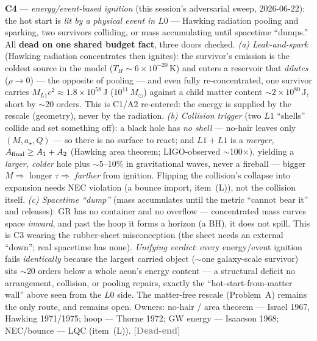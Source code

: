 \documentclass[11pt]{article}
\newcommand{\dead}{\textcolor{gray}{\textbf{[Dead-end]}}}
\newcommand{\msun}{M_\odot}
\begin{document}
\textbf{C4} --- \emph{energy/event-based ignition} (this session's adversarial sweep, 2026-06-22): the hot start is \emph{lit by a physical event in $L0$} --- Hawking radiation pooling and sparking, two survivors colliding, or mass accumulating until spacetime ``dumps.'' All \textbf{dead on one shared budget fact}, three doors checked. \emph{(a) Leak-and-spark} (Hawking radiation concentrates then ignites): the survivor's emission is the coldest source in the model ($T_H\sim6\times10^{-20}$\,K) and enters a reservoir that \emph{dilutes} ($\rho\to0$) --- the opposite of pooling --- and even fully re-concentrated, one survivor carries $M_{L1}c^2\approx1.8\times10^{58}$\,J ($10^{11}\,\msun$) against a child matter content $\sim2\times10^{80}$\,J, short by $\sim$20 orders. This is C1/A2 re-entered: the energy is supplied by the rescale (geometry), never by the radiation. \emph{(b) Collision trigger} (two $L1$ ``shells'' collide and set something off): a black hole has \emph{no shell} --- no-hair leaves only $(M,a_\star,Q)$ --- so there is no surface to react; and $L1+L1$ is a \emph{merger}, $A_{\rm final}\ge A_1+A_2$ (Hawking area theorem; LIGO-observed $\sim$100$\times$), yielding a \emph{larger, colder} hole plus $\sim$5--10\% in gravitational waves, never a fireball --- bigger $M\Rightarrow$ longer $\tau\Rightarrow$ \emph{farther} from ignition. Flipping the collision's collapse into expansion needs NEC violation (a bounce import, item~(L)), not the collision itself. \emph{(c) Spacetime ``dump''} (mass accumulates until the metric ``cannot bear it'' and releases): GR has no container and no overflow --- concentrated mass curves space \emph{inward}, and past the hoop it forms a horizon (a BH), it does not spill. This is C3 wearing the rubber-sheet misconception (the sheet needs an external ``down''; real spacetime has none). \emph{Unifying verdict}: every energy/event ignition fails \emph{identically} because the largest carried object ($\sim$one galaxy-scale survivor) sits $\sim$20 orders below a whole aeon's energy content --- a structural deficit no arrangement, collision, or pooling repairs, exactly the ``hot-start-from-matter wall'' above seen from the $L0$ side. The matter-free rescale (Problem~A) remains the only route, and remains open. Owners: no-hair / area theorem --- Israel 1967, Hawking 1971/1975; hoop --- Thorne 1972; GW energy --- Isaacson 1968; NEC/bounce --- LQC (item~(L)). \dead\quad
\end{document}
